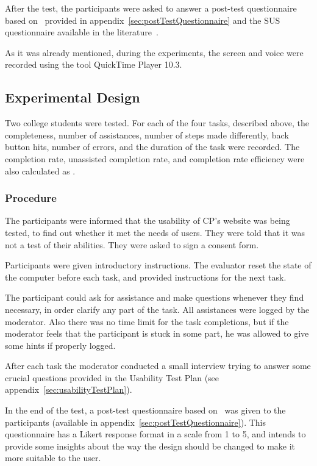 \documentclass[a4paper]{article}
\begin{document}
After the test, the participants were asked to answer a post-test questionnaire based on~\citep{lawton2004wai_ut} provided in appendix~\ref{sec:postTestQuestionnaire} and the SUS questionnaire available in the literature~\citep{brooke1996sus}.

As it was already mentioned, during the experiments, the screen and voice were recorded using the tool QuickTime Player 10.3.

\subsection{Experimental Design}

Two college students were tested. For each of the four tasks, described above, the completeness, number of assistances, number of steps made differently, back button hits, number of errors, and the duration of the task were recorded. The completion rate, unassisted completion rate, and completion rate efficiency were also calculated as .

\subsubsection{Procedure}

The participants were informed that the usability of CP's website was being tested, to find out whether it met the needs of users. They were told that it was not a test of their abilities. They were asked to sign a consent form.

Participants were given introductory instructions. The evaluator reset the state of the computer before each task, and provided instructions for the next task. 

The participant could ask for assistance and make questions whenever they find necessary, in order clarify any part of the task. All assistances were logged by the moderator. Also there was no time limit for the task completions, but if the moderator feels that the participant is stuck in some part, he was allowed to give some hints if properly logged.

After each task the moderator conducted a small interview trying to answer some crucial questions provided in the Usability Test Plan (see appendix~\ref{sec:usabilityTestPlan}).

In the end of the test, a post-test questionnaire based on~\citep{lawton2004wai_ut} was given to the participants (available in appendix~\ref{sec:postTestQuestionnaire}).
This questionnaire has a Likert response format in a scale from 1 to 5, and intends to provide some insights about the way the design should be changed to make it more suitable to the user.
\end{document}
